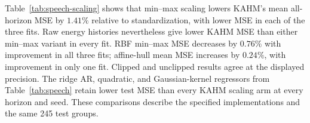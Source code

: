 Table~\ref{tab:speech-scaling} shows that min--max scaling lowers KAHM's mean
all-horizon MSE by $1.41\%$ relative to standardization, with lower MSE in
each of the three fits. Raw energy histories nevertheless give lower KAHM
MSE than either min--max variant in every fit. RBF min--max MSE decreases by
$0.76\%$ with improvement in all three fits; affine-hull mean MSE increases
by $0.24\%$, with improvement in only one fit. Clipped and unclipped results
agree at the displayed precision. The ridge AR, quadratic, and
Gaussian-kernel regressors from Table~\ref{tab:speech} retain lower test MSE
than every KAHM scaling arm at every horizon and seed. These comparisons
describe the specified implementations and the same 245 test groups.
